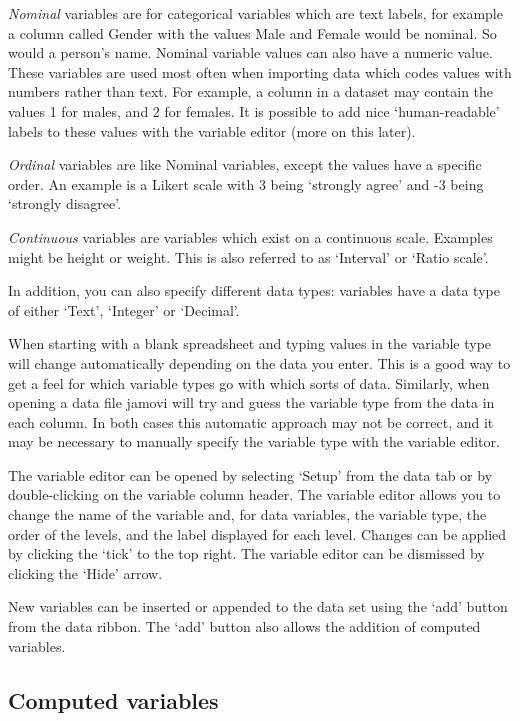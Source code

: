 \documentclass[
]{book}
\begin{document}
\emph{Nominal} variables are for categorical variables which are text labels, for example a column called Gender with the values Male and Female would be nominal. So would a person's name. Nominal variable values can also have a numeric value. These variables are used most often when importing data which codes values with numbers rather than text. For example, a column in a dataset may contain the values 1 for males, and 2 for females. It is possible to add nice `human-readable' labels to these values with the variable editor (more on this later).

\emph{Ordinal} variables are like Nominal variables, except the values have a specific order. An example is a Likert scale with 3 being `strongly agree' and -3 being `strongly disagree'.

\emph{Continuous} variables are variables which exist on a continuous scale. Examples might be height or weight. This is also referred to as `Interval' or `Ratio scale'.

In addition, you can also specify different data types: variables have a data type of either `Text', `Integer' or `Decimal'.

When starting with a blank spreadsheet and typing values in the variable type will change automatically depending on the data you enter. This is a good way to get a feel for which variable types go with which sorts of data. Similarly, when opening a data file jamovi will try and guess the variable type from the data in each column. In both cases this automatic approach may not be correct, and it may be necessary to manually specify the variable type with the variable editor.

The variable editor can be opened by selecting `Setup' from the data tab or by double-clicking on the variable column header. The variable editor allows you to change the name of the variable and, for data variables, the variable type, the order of the levels, and the label displayed for each level. Changes can be applied by clicking the `tick' to the top right. The variable editor can be dismissed by clicking the `Hide' arrow.

New variables can be inserted or appended to the data set using the `add' button from the data ribbon. The `add' button also allows the addition of computed variables.

\hypertarget{computed-variables}{%
\subsection{Computed variables}\label{computed-variables}}
\end{document}

